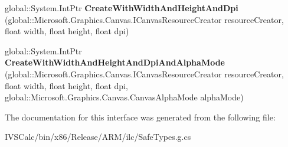 \begin{DoxyCompactItemize}
global\+::\+System.\+Int\+Ptr {\bfseries Create\+With\+Width\+And\+Height\+And\+Dpi} (global\+::\+Microsoft.\+Graphics.\+Canvas.\+I\+Canvas\+Resource\+Creator resource\+Creator, float width, float height, float dpi)
\item 
\mbox{\label{interface_microsoft_1_1_graphics_1_1_canvas_1_1_u_i_1_1_xaml_1_1_i_canvas_virtual_image_source_factory_ac23a6e94d90c7e30a156e1261f94f38c}} 
global\+::\+System.\+Int\+Ptr {\bfseries Create\+With\+Width\+And\+Height\+And\+Dpi\+And\+Alpha\+Mode} (global\+::\+Microsoft.\+Graphics.\+Canvas.\+I\+Canvas\+Resource\+Creator resource\+Creator, float width, float height, float dpi, global\+::\+Microsoft.\+Graphics.\+Canvas.\+Canvas\+Alpha\+Mode alpha\+Mode)
\end{DoxyCompactItemize}


The documentation for this interface was generated from the following file\+:\begin{DoxyCompactItemize}
\item 
I\+V\+S\+Calc/bin/x86/\+Release/\+A\+R\+M/ilc/Safe\+Types.\+g.\+cs\end{DoxyCompactItemize}
